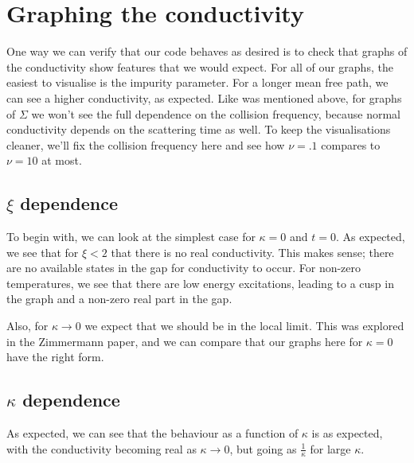 \documentclass[11pt]{article}
\begin{document}
\section{Graphing the conductivity} \label{sec:NamForm.Graph}

One way we can verify that our code behaves as desired is to check that graphs of the conductivity show features that we would expect.
For all of our graphs, the easiest to visualise is the impurity parameter.
For a longer mean free path, we can see a higher conductivity, as expected.
Like was mentioned above, for graphs of $\Sigma$ we won't see the full dependence on the collision frequency, because normal conductivity depends on the scattering time as well.
To keep the visualisations cleaner, we'll fix the collision frequency here and see how $\nu = .1$ compares to $\nu = 10$ at most.

\subsection{$\xi$ dependence} \label{subsec:NamForm.Graph.OmegaDep}
To begin with, we can look at the simplest case for $\kappa = 0$ and $t = 0$. 
As expected, we see that for $\xi < 2$ that there is no real conductivity. This makes sense; there are no available states in the gap for conductivity to occur. 
For non-zero temperatures, we see that there are low energy excitations, leading to a cusp in the graph and a non-zero real part in the gap. 

Also, for $\kappa \rightarrow 0$ we expect that we should be in the local limit.
This was explored in the Zimmermann paper, and we can compare that our graphs here for $\kappa = 0$ have the right form. 

\subsection{$\kappa$ dependence} \label{subsec:NamForm.Graph.KDep}
As expected, we can see that the behaviour as a function of $\kappa$ is as expected, with the conductivity becoming real as $\kappa \rightarrow 0$, but going as $\frac{1}{\kappa}$ for large $\kappa$. 
\end{document}
